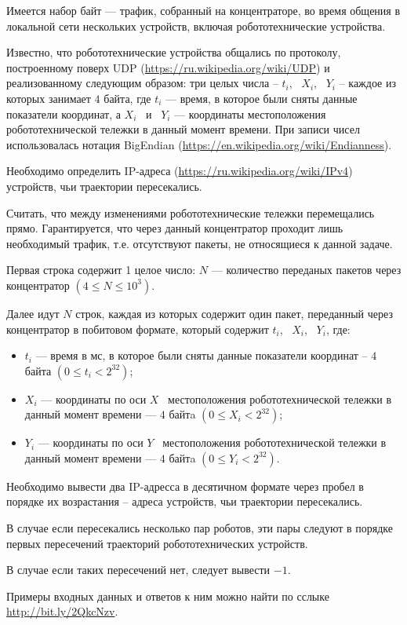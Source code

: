 
Имеется набор байт --- трафик, собранный на концентраторе, во время общения в локальной сети нескольких  устройств,
включая робототехнические устройства.

Известно, что робототехнические устройства общались по протоколу, построенному поверх UDP (\url{https://ru.wikipedia.org/wiki/UDP}) и
реализованному следующим образом: три целых числа -- $t_i$,~ $X_i$, ~$Y_i$ -- каждое из которых занимает $4$ байта,
где $t_i$ --- время, в которое были сняты данные показатели координат, а $X_i$ ~и~ $Y_i$ --- координаты местоположения
робототехнической тележки в данный момент времени.
При записи чисел использовалась нотация BigEndian (\url{https://en.wikipedia.org/wiki/Endianness}).

Необходимо определить IP-адреса (\url{https://ru.wikipedia.org/wiki/IPv4}) устройств, чьи траектории пересекались.


Считать, что между изменениями робототехнические тележки перемещались прямо.
Гарантируется, что через данный концентратор проходит лишь необходимый трафик, т.е. отсутствуют пакеты,
не относящиеся к данной задаче.



Первая строка содержит 1 целое число: $N$ --- количество переданых пакетов через концентратор  $(4 \leq N \leq 10^3)$.

Далее идут $N$ строк, каждая из которых содержит один пакет, переданный через концентратор в побитовом формате, который содержит
$t_i$,~ $X_i$, ~$Y_i$, где:
\begin{itemize}
    \item $t_i$ --- время в мс, в которое были сняты данные показатели координат -- $4$ байта $(0 \leq t_i < 2^{32})$;
    \item $X_i$ --- координаты по оси $X$~ местоположения робототехнической тележки в данный момент времени --- $4$ байтa $(0 \leq X_i < 2^{32})$;
    \item $Y_i$ --- координаты по оси $Y$~ местоположения робототехнической тележки в данный момент времени --- $4$ байтa $(0 \leq Y_i < 2^{32})$.
\end{itemize}

\outputfmtSection

Необходимо вывести два IP-адресса в десятичном формате через пробел в порядке их возрастания -- адреса устройств,
чьи траектории пересекались.

В случае если пересекались несколько пар роботов, эти пары следуют в порядке первых пересечений траекторий
робототехнических устройств.

В случае если таких пересечений нет, следует вывести $-1$.

\exampleSection

Примеры входных данных и ответов к ним можно найти по сслыке \url{http://bit.ly/2QkcNzv}.



